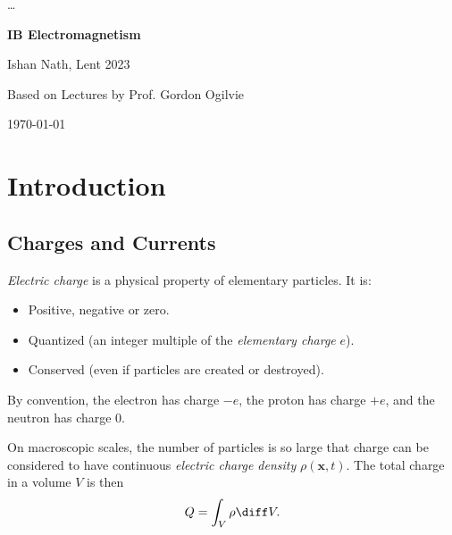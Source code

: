 \documentclass[12pt]{article}
\begin{document}
\robustify\dots
{}

\hypersetup{pageanchor=false}
\begin{titlepage}
	\begin{center}
		\vspace*{1em}
		\Huge
		\textbf{IB Electromagnetism}

		\vspace{1em}
		\large
		Ishan Nath, Lent 2023

		\vspace{1.5em}

		\Large

		Based on Lectures by Prof. Gordon Ogilvie

		\vspace{1em}

		\large
		\today
	\end{center}
	
\end{titlepage}
\hypersetup{pageanchor=true}

\tableofcontents

\newpage

\section{Introduction}
\label{sec:introduction}

\subsection{Charges and Currents}
\label{sub:charges_and_currents}

\emph{Electric charge} is a physical property of elementary particles. It is:
\begin{itemize}
	\item Positive, negative or zero.
	\item Quantized (an integer multiple of the \emph{elementary charge} $e$).
	\item Conserved (even if particles are created or destroyed).
\end{itemize}

By convention, the electron has charge $-e$, the proton has charge $+e$, and the neutron has charge $0$.

On macroscopic scales, the number of particles is so large that charge can be considered to have continuous \emph{electric charge density} $\rho(\mathbf{x},t)$. The total charge in a volume $V$ is then
\[
Q = \int_{V} \rho \diff V
.\]
\end{document}

